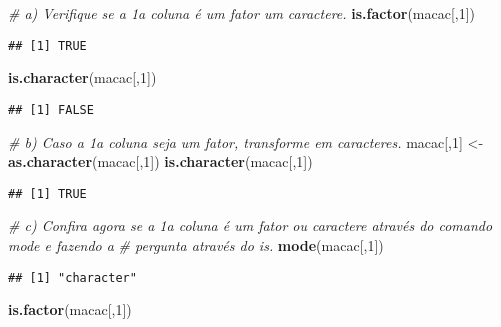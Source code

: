 \documentclass[]{article}
\newenvironment{Shaded}{\begin{snugshade}}{\end{snugshade}}
\newcommand{\CommentTok}[1]{\textcolor[rgb]{0.56,0.35,0.01}{\textit{#1}}}
\newcommand{\DecValTok}[1]{\textcolor[rgb]{0.00,0.00,0.81}{#1}}
\newcommand{\KeywordTok}[1]{\textcolor[rgb]{0.13,0.29,0.53}{\textbf{#1}}}
\newcommand{\NormalTok}[1]{#1}
\newcommand{\StringTok}[1]{\textcolor[rgb]{0.31,0.60,0.02}{#1}}
\begin{document}
\begin{Shaded}
\begin{Highlighting}[]
\CommentTok{# a) Verifique se a 1a coluna é um fator um caractere.}
\KeywordTok{is.factor}\NormalTok{(macac[,}\DecValTok{1}\NormalTok{])}
\end{Highlighting}
\end{Shaded}

\begin{verbatim}
## [1] TRUE
\end{verbatim}

\begin{Shaded}
\begin{Highlighting}[]
\KeywordTok{is.character}\NormalTok{(macac[,}\DecValTok{1}\NormalTok{])}
\end{Highlighting}
\end{Shaded}

\begin{verbatim}
## [1] FALSE
\end{verbatim}

\begin{Shaded}
\begin{Highlighting}[]
\CommentTok{# b) Caso a 1a coluna seja um fator, transforme em caracteres.}
\NormalTok{macac[,}\DecValTok{1}\NormalTok{] <-}\StringTok{ }\KeywordTok{as.character}\NormalTok{(macac[,}\DecValTok{1}\NormalTok{])}
\KeywordTok{is.character}\NormalTok{(macac[,}\DecValTok{1}\NormalTok{])}
\end{Highlighting}
\end{Shaded}

\begin{verbatim}
## [1] TRUE
\end{verbatim}

\begin{Shaded}
\begin{Highlighting}[]
\CommentTok{# c) Confira agora se a 1a coluna é um fator ou caractere através do comando mode e fazendo a}
\CommentTok{# pergunta através do is.}
\KeywordTok{mode}\NormalTok{(macac[,}\DecValTok{1}\NormalTok{])}
\end{Highlighting}
\end{Shaded}

\begin{verbatim}
## [1] "character"
\end{verbatim}

\begin{Shaded}
\begin{Highlighting}[]
\KeywordTok{is.factor}\NormalTok{(macac[,}\DecValTok{1}\NormalTok{])}
\end{Highlighting}
\end{Shaded}
\end{document}
